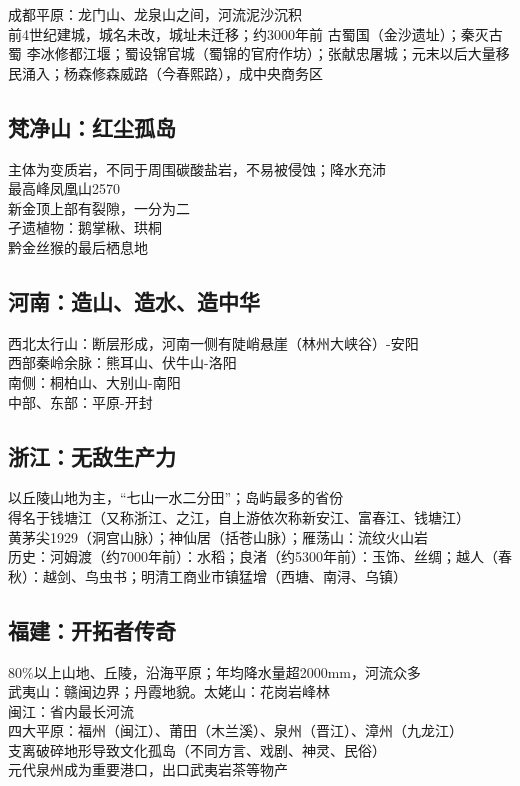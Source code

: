 成都平原：龙门山、龙泉山之间，河流泥沙沉积\\
前4世纪建城，城名未改，城址未迁移；约3000年前 古蜀国（金沙遗址）；秦灭古蜀 李冰修都江堰；蜀设锦官城（蜀锦的官府作坊）；张献忠屠城；元末以后大量移民涌入；杨森修森威路（今春熙路），成中央商务区

\subsection*{梵净山：红尘孤岛}

主体为变质岩，不同于周围碳酸盐岩，不易被侵蚀；降水充沛\\
最高峰凤凰山2570\\
新金顶上部有裂隙，一分为二\\
孑遗植物：鹅掌楸、珙桐\\
黔金丝猴的最后栖息地

\subsection*{河南：造山、造水、造中华}

西北太行山：断层形成，河南一侧有陡峭悬崖（林州大峡谷）-安阳\\
西部秦岭余脉：熊耳山、伏牛山-洛阳\\
南侧：桐柏山、大别山-南阳\\
中部、东部：平原-开封

\subsection*{浙江：无敌生产力}

以丘陵山地为主，“七山一水二分田”；岛屿最多的省份\\
得名于钱塘江（又称浙江、之江，自上游依次称新安江、富春江、钱塘江）\\
黄茅尖1929（洞宫山脉）；神仙居（括苍山脉）；雁荡山：流纹火山岩\\
历史：河姆渡（约7000年前）：水稻；良渚（约5300年前）：玉饰、丝绸；越人（春秋）：越剑、鸟虫书；明清工商业市镇猛增（西塘、南浔、乌镇）

\subsection*{福建：开拓者传奇}

80\%以上山地、丘陵，沿海平原；年均降水量超2000mm，河流众多\\
武夷山：赣闽边界；丹霞地貌。太姥山：花岗岩峰林\\
闽江：省内最长河流\\
四大平原：福州（闽江）、莆田（木兰溪）、泉州（晋江）、漳州（九龙江）\\
支离破碎地形导致文化孤岛（不同方言、戏剧、神灵、民俗）\\
元代泉州成为重要港口，出口武夷岩茶等物产

